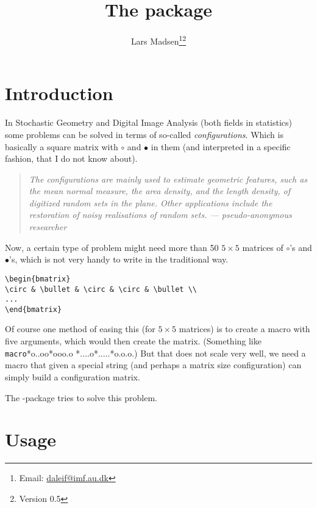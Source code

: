 \documentclass[a4paper,11pt,article]{memoir}
\makeatletter
\newcommand*\marg@s[1]{\textnormal{\texttt{\{#1\}}}}
\newcommand*\marg@n[1]{%
  \textnormal{\texttt{\{}$\langle$\textit{#1}$\rangle$\texttt{\}}}%
}
\newcommand*\marg{\@ifstar{\marg@s}{\marg@n}}
\providecommand*\cs[1]{\textnormal{\texttt{\symbol{'134}#1}}}
\makeatother
\begin{document}
\title{The \textsf{\jobname} package}
\author{Lars Madsen\thanks{Email:
    \protect\url{daleif@imf.au.dk}}\thanks{Version 0.5}}
\maketitle

\chapter{Introduction}
\label{cha:introduction}

In Stochastic Geometry and Digital Image Analysis (both fields in
statistics) some problems can be solved in terms of so-called
\emph{configurations}. Which is basically a square matrix with
$\circ$ and $\bullet$ in them (and interpreted in a specific fashion,
that I do not know about).
\begin{quote}
  \itshape The configurations are mainly used to estimate geometric
  features, such as the mean normal measure, the area density, and the
  length density, of digitized random sets in the plane. Other
  applications include the restoration of noisy realisations of random
  sets. \hfill --- pseudo-anonymous researcher
\end{quote}
Now, a certain type of problem might need more than 50 $5\times5$
matrices of $\circ$'s and $\bullet$'s, which is not very handy to
write in the traditional way.
\begin{verbatim}
\begin{bmatrix}
\circ & \bullet & \circ & \circ & \bullet \\
...
\end{bmatrix}
\end{verbatim}

Of course one method of easing this (for $5\times5$ matrices) is to
create a macro with five arguments, which would then create the
matrix. (Something like \cs{macro}\marg*{o..oo}\marg*{ooo.o}%
\marg*{....o}\allowbreak\marg*{.....}\marg*{o.o.o}.) But that does not
scale very well, we need a macro that given a special string (and
perhaps a matrix size configuration) can simply build a
configuration matrix.

The \jobname-package tries to solve this problem.


\chapter{Usage}
\label{cha:usage}
\end{document}
